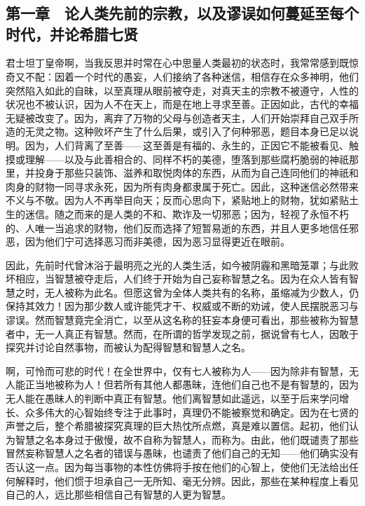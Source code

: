 \section{}


\subsection{第一章　论人类先前的宗教，以及谬误如何蔓延至每个时代，并论希腊七贤}

君士坦丁皇帝啊，当我反思并时常在心中思量人类最初的状态时，我常常感到既惊奇又不配：因着一个时代的愚妄，人们接纳了各种迷信，相信存在众多神明，他们突然陷入如此的自昧，以至真理从眼前被夺走，对真天主的宗教不被遵守，人性的状况也不被认识，因为人不在天上，而是在地上寻求至善。正因如此，古代的幸福无疑被改变了。因为，离弃了万物的父母与创造者天主，人们开始崇拜自己双手所造的无灵之物。这种败坏产生了什么后果，或引入了何种邪恶，题目本身已足以说明。因为，人们背离了至善——这至善是有福的、永生的，正因它不能被看见、触摸或理解——以及与此善相合的、同样不朽的美德，堕落到那些腐朽脆弱的神祇那里，并投身于那些只装饰、滋养和取悦肉体的东西，从而为自己连同他们的神祇和肉身的财物一同寻求永死，因为所有肉身都隶属于死亡。因此，这种迷信必然带来不义与不敬。因为人不再举目向天；反而心思向下，紧贴地上的财物，犹如紧贴土生的迷信。随之而来的是人类的不和、欺诈及一切邪恶；因为，轻视了永恒不朽的、人唯一当追求的财物，他们反而选择了短暂易逝的东西，并且人更多地信任邪恶，因为他们宁可选择恶习而非美德，因为恶习显得更近在眼前。\par

因此，先前时代曾沐浴于最明亮之光的人类生活，如今被阴霾和黑暗笼罩；与此败坏相应，当智慧被夺走后，人们终于开始为自己妄称智慧之名。因为在众人皆有智慧之时，无人被称为此名。但愿这曾为全体人类共有的名称，虽缩减为少数人，仍保持其效力！因为那少数人或许能凭才干、权威或不断的劝诫，使人民摆脱恶习与谬误。然而智慧竟完全消亡，以至从这名称的狂妄本身便可看出，那些被称为智慧者中，无一人真正有智慧。然而，在所谓的哲学发现之前，据说曾有七人，因敢于探究并讨论自然事物，而被认为配得智慧和智慧人之名。\par

啊，可怜而可悲的时代！在全世界中，仅有七人被称为人——因为除非有智慧，无人能正当地被称为人！但若所有其他人都愚昧，连他们自己也不是有智慧的，因为无人能在愚昧人的判断中真正有智慧。他们离智慧如此遥远，以至于后来学问增长、众多伟大的心智始终专注于此事时，真理仍不能被察觉和确定。因为在七贤的声誉之后，整个希腊被探究真理的巨大热忱所点燃，真是难以置信。起初，他们认为智慧之名本身过于傲慢，故不自称为智慧人，而称为。由此，他们既谴责了那些冒然妄称智慧人之名者的错误与愚昧，也谴责了他们自己的无知——他们确实没有否认这一点。因为每当事物的本性仿佛将手按在他们的心智上，使他们无法给出任何解释时，他们惯于坦承自己一无所知、毫无分辨。因此，那些在某种程度上看见自己的人，远比那些相信自己有智慧的人更为智慧。\par

